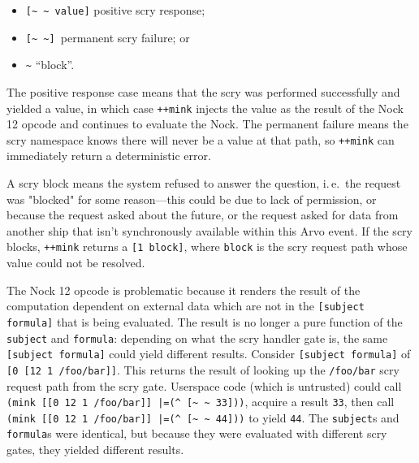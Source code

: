 \documentclass[twoside]{article}
\begin{document}
\begin{itemize}
  \item  \lstinline[style=inlinecode]{[~ ~ value]} positive scry response;
  \item  \lstinline[style=inlinecode]{[~ ~] }permanent scry failure; or
  \item  \lstinline[style=inlinecode]{~} ``block''.
\end{itemize}

\noindent
The positive response case means that the scry was performed successfully and yielded a value, in which case \lstinline[style=inlinecode]{++mink} injects the value as the result of the Nock 12 opcode and continues to evaluate the Nock.  The permanent failure means the scry namespace knows there will never be a value at that path, so \lstinline[style=inlinecode]{++mink} can immediately return a deterministic error.

A scry block means the system refused to answer the question, i.\,e.\ the request was "blocked" for some reason—this could be due to lack of permission, or because the request asked about the future, or the request asked for data from another ship that isn't synchronously available within this Arvo event. If the scry blocks, \lstinline[style=inlinecode]{++mink} returns a \lstinline[style=inlinecode]{[1 block]}, where \lstinline[style=inlinecode]{block} is the scry request path whose value could not be resolved.

The Nock 12 opcode is problematic because it renders the result of the computation dependent on external data which are not in the \lstinline[style=inlinecode]{[subject formula]} that is being evaluated.  The result is no longer a pure function of the \lstinline[style=inlinecode]{subject} and \lstinline[style=inlinecode]{formula}:  depending on what the scry handler gate is, the same \lstinline[style=inlinecode]{[subject formula]} could yield different results.  Consider \lstinline[style=inlinecode]{[subject formula]} of \lstinline[style=inlinecode]{[0 [12 1 /foo/bar]]}.  This returns the result of looking up the \lstinline[style=inlinecode]{/foo/bar} scry request path from the scry gate. Userspace code (which is untrusted) could call \lstinline[style=inlinecode]{(mink [[0 12 1 /foo/bar]] |=(^ [~ ~ 33]))}, acquire a result \lstinline[style=inlinecode]{33}, then call \lstinline[style=inlinecode]{(mink [[0 12 1 /foo/bar]] |=(^ [~ ~ 44]))} to yield \lstinline[style=inlinecode]{44}.  The \lstinline[style=inlinecode]{subject}s and \lstinline[style=inlinecode]{formula}s were identical, but because they were evaluated with different scry gates, they yielded different results.
\end{document}
